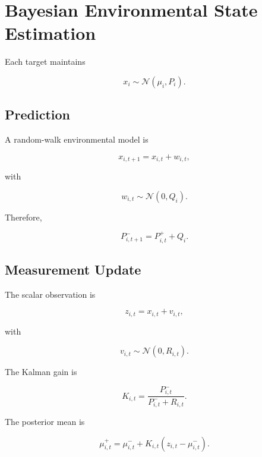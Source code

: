 \documentclass[11pt,a4paper]{article}
\begin{document}
\section{Bayesian Environmental State Estimation}

Each target maintains

\begin{equation}
x_i
\sim
\mathcal N(\mu_i,P_i).
\end{equation}

\subsection{Prediction}

A random-walk environmental model is

\begin{equation}
x_{i,t+1}
=
x_{i,t}
+
w_{i,t},
\end{equation}

with

\begin{equation}
w_{i,t}
\sim
\mathcal N(0,Q_i).
\end{equation}

Therefore,

\begin{equation}
P_{i,t+1}^{-}
=
P_{i,t}^{+}
+
Q_i.
\end{equation}

\subsection{Measurement Update}

The scalar observation is

\begin{equation}
z_{i,t}
=
x_{i,t}
+
v_{i,t},
\end{equation}

with

\begin{equation}
v_{i,t}
\sim
\mathcal N(0,R_{i,t}).
\end{equation}

The Kalman gain is

\begin{equation}
K_{i,t}
=
\frac{
P_{i,t}^{-}
}{
P_{i,t}^{-}+R_{i,t}
}.
\end{equation}

The posterior mean is

\begin{equation}
\mu_{i,t}^{+}
=
\mu_{i,t}^{-}
+
K_{i,t}
\left(
z_{i,t}
-
\mu_{i,t}^{-}
\right).
\end{equation}
\end{document}
